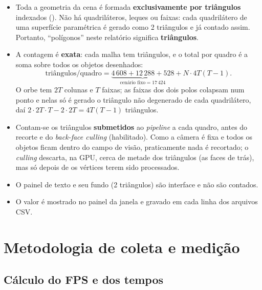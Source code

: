 \documentclass[12pt,a4paper]{article}
\newcommand{\code}[1]{\texttt{\detokenize{#1}}}
\begin{document}
\begin{itemize}
  \item Toda a geometria da cena é formada \textbf{exclusivamente por triângulos} indexados
        (\code{GL_TRIANGLES}). Não há quadriláteros, leques ou faixas: cada quadrilátero de uma
        superfície paramétrica é gerado como 2 triângulos e já contado assim. Portanto,
        ``polígonos'' neste relatório significa \textbf{triângulos}.
  \item A contagem é \textbf{exata}: cada malha tem \code{indices.size()/3} triângulos, e o total
        por quadro é a soma sobre todos os objetos desenhados:
        \begin{equation}
          \text{triângulos/quadro} = \underbrace{4\,608 + 12\,288 + 528}_{\text{cenário fixo} = 17\,424}
          + N \cdot 4T(T-1).
        \end{equation}
        O orbe tem $2T$ colunas e $T$ faixas; as faixas dos dois polos colapsam num ponto e nelas
        só é gerado o triângulo não degenerado de cada quadrilátero, daí
        $2\cdot 2T\cdot T - 2\cdot 2T = 4T(T-1)$ triângulos.
  \item Contam-se os triângulos \textbf{submetidos} ao \emph{pipeline} a cada quadro, antes do
        recorte e do \emph{back-face culling} (habilitado). Como a câmera é fixa e todos os
        objetos ficam dentro do campo de visão, praticamente nada é recortado; o
        \emph{culling} descarta, na GPU, cerca de metade dos triângulos (as faces de trás), mas
        só depois de os vértices terem sido processados.
  \item O painel de texto e seu fundo (2 triângulos) são interface e não são contados.
  \item O valor é mostrado no painel da janela e gravado em cada linha dos arquivos CSV.
\end{itemize}

\section{Metodologia de coleta e medição}

\subsection{Cálculo do FPS e dos tempos}
\end{document}
